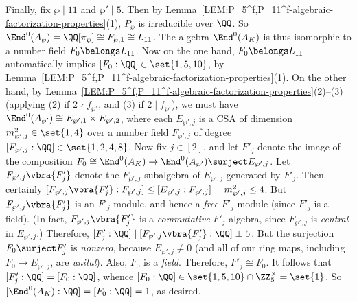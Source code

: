 \documentclass[12pt]{report}
\begin{document}
{Finally,
fix $\wp\mid11$ and $\wp'\mid5$.
Then by Lemma~\ref{LEM:P_5^f,P_11^f-algebraic-factorization-properties}(1),
$P_\wp$ is irreducible over $\QQ$.
So $\End^0(A_\wp)=\QQ[\pi_\wp]\cong F_{\wp,1}\cong L_{11}$.
The algebra $\End^0(A_K)$ is thus isomorphic to a number field $F_0\belongs L_{11}$.
Now on the one hand,
$F_0\belongs L_{11}$ automatically implies $[F_0:\QQ]\in\set{1,5,10}$,
by Lemma~\ref{LEM:P_5^f,P_11^f-algebraic-factorization-properties}(1).
On the other hand,
by Lemma~\ref{LEM:P_5^f,P_11^f-algebraic-factorization-properties}(2)--(3)
(applying (2) if $2\nmid f_{\wp'}$,
and (3) if $2\mid f_{\wp'}$),
we must have $\End^0(A_{\wp'})\cong E_{\wp',1}\times E_{\wp',2}$,
where each $E_{\wp',j}$ is a CSA of dimension $m_{\wp',j}^2\in\set{1,4}$ over a number field $F_{\wp',j}$ of degree $[F_{\wp',j}:\QQ]\in\set{1,2,4,8}$.
Now fix $j\in[2]$,
and let $F'_j$ denote the image of the composition $F_0\cong\End^0(A_K)\to\End^0(A_{\wp'})\surject E_{\wp',j}$.
Let $F_{\wp',j}\vbra{F'_j}$ denote the $F_{\wp',j}$-subalgebra of $E_{\wp',j}$ generated by $F'_j$.
Then certainly $[F_{\wp',j}\vbra{F'_j}: F_{\wp',j}]\leq [E_{\wp',j}: F_{\wp',j}] = m_{\wp',j}^2\leq 4$.
But $F_{\wp',j}\vbra{F'_j}$ is an $F'_j$-module, and hence a \emph{free} $F'_j$-module (since $F'_j$ is a field).
(In fact, $F_{\wp',j}\vbra{F'_j}$ is a \emph{commutative} $F'_j$-algebra, since $F_{\wp',j}$ is \emph{central} in $E_{\wp',j}$.)
Therefore, $[F'_j: \QQ]\mid [F_{\wp',j}\vbra{F'_j}: \QQ]\perp 5$.
But the surjection $F_0\surject F'_j$ is \emph{nonzero},
because $E_{\wp',j}\neq0$
(and all of our ring maps,
including $F_0\to E_{\wp',j}$,
are \emph{unital}).
Also,
$F_0$ is a \emph{field}.
Therefore,
$F'_j\cong F_0$.
It follows that
$[F'_j:\QQ]=[F_0:\QQ]$,
whence $[F_0:\QQ]\in \set{1,5,10}\cap \ZZ_5^\times = \set{1}$.
So $[\End^0(A_K):\QQ]=[F_0:\QQ] = 1$,
as desired.
}

\end{document}
